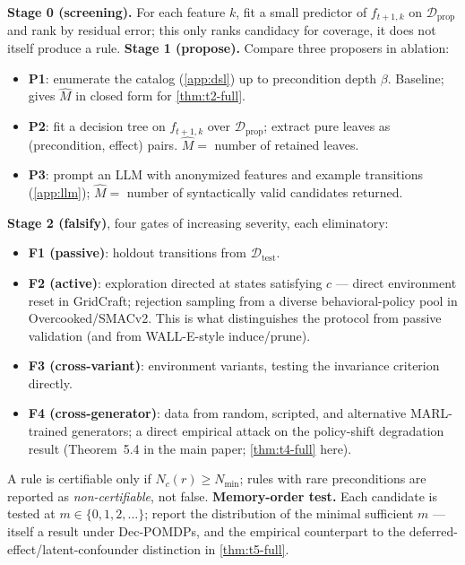 \documentclass[11pt]{article}
\theoremstyle{plain}
\theoremstyle{definition}
\theoremstyle{remark}
\begin{document}
\begin{algorithm}[H]
\caption{Discover, falsify, inject (full)}
\begin{algorithmic}[1]
\STATE \textbf{Stage 0 (screening).} For each feature $k$, fit a small predictor of $f_{t+1,k}$ on $\mathcal{D}_{\mathrm{prop}}$ and rank by residual error; this only ranks candidacy for coverage, it does not itself produce a rule.
\STATE \textbf{Stage 1 (propose).} Compare three proposers in ablation:
  \begin{itemize}
    \item \textbf{P1}: enumerate the catalog (\autoref{app:dsl}) up to precondition depth $\beta$. Baseline; gives $\hat M$ in closed form for \autoref{thm:t2-full}.
    \item \textbf{P2}: fit a decision tree on $f_{t+1,k}$ over $\mathcal{D}_{\mathrm{prop}}$; extract pure leaves as (precondition, effect) pairs. $\hat M=$ number of retained leaves.
    \item \textbf{P3}: prompt an LLM with anonymized features and example transitions (\autoref{app:llm}); $\hat M=$ number of syntactically valid candidates returned.
  \end{itemize}
\STATE \textbf{Stage 2 (falsify)}, four gates of increasing severity, each eliminatory:
  \begin{itemize}
    \item \textbf{F1 (passive)}: holdout transitions from $\mathcal{D}_{\mathrm{test}}$.
    \item \textbf{F2 (active)}: exploration directed at states satisfying $c$ --- direct environment reset in GridCraft; rejection sampling from a diverse behavioral-policy pool in Overcooked/SMACv2. This is what distinguishes the protocol from passive validation (and from WALL-E-style induce/prune).
    \item \textbf{F3 (cross-variant)}: environment variants, testing the invariance criterion directly.
    \item \textbf{F4 (cross-generator)}: data from random, scripted, and alternative MARL-trained generators; a direct empirical attack on the policy-shift degradation result (Theorem~5.4 in the main paper; \autoref{thm:t4-full} here).
  \end{itemize}
  A rule is certifiable only if $N_c(r)\ge N_{\min}$; rules with rare preconditions are reported as \emph{non-certifiable}, not false.
\STATE \textbf{Memory-order test.} Each candidate is tested at $m\in\{0,1,2,\dots\}$; report the distribution of the minimal sufficient $m$ --- itself a result under Dec-POMDPs, and the empirical counterpart to the deferred-effect/latent-confounder distinction in \autoref{thm:t5-full}.

\end{algorithmic}
\end{algorithm}
\end{document}
